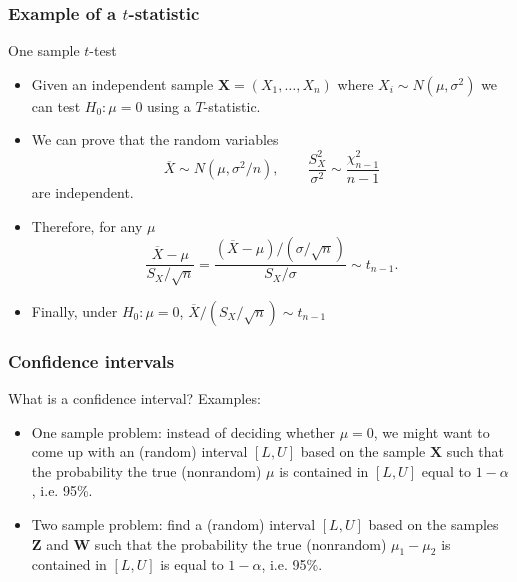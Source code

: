 \documentclass[handout]{beamer}
\begin{document}
   \begin{frame} \frametitle{Example of a $t$-statistic}

   \begin{block}
   {One sample $t$-test}
   \begin{itemize}

   \item Given an independent sample $\pmb{X}=(X_1, \dots, X_n)$ where $X_i\sim N(\mu,\sigma^2)$ we can test $H_0:\mu=0$ using a $T$-statistic.

   \item We can prove that the random variables
   $$\overline{X} \sim N(\mu, \sigma^2/n), \qquad \frac{S^2_X}{\sigma^2} \sim \frac{\chi^2_{n-1}}{n-1}$$
   are independent.

   \item Therefore, for any $\mu$
   $$
   \frac{\overline{X} - \mu}{S_X / \sqrt{n}} = \frac{ (\overline{X}-\mu) / (\sigma/\sqrt{n})}{S_X / \sigma} \sim t_{n-1}.$$
   \item Finally, under $H_0:\mu=0$, $\overline{X}/(S_X/\sqrt{n}) \sim t_{n-1}
   $
   \end{itemize}
   \end{block}
   \end{frame}


   \begin{frame} \frametitle{Confidence intervals}

   \begin{block}
   {What is a confidence interval?}
   Examples:
   \begin{itemize}[<+->]
   \item One sample problem: instead of deciding whether $\mu=0$, we might want to come up with an (random) interval $[L,U]$ based on the sample $\pmb{X}$ such that the probability
   the true (nonrandom) $\mu$ is contained in $[L,U]$ equal to $1-\alpha$, i.e. 95\%.
   \item Two sample problem: find a (random) interval $[L,U]$ based on the samples $\pmb{Z}$ and $\pmb{W}$ such that
   the probability the true (nonrandom) $\mu_1-\mu_2$ is contained in $[L,U]$ is equal to $1-\alpha$, i.e. 95\%.
   \end{itemize}
   \end{block}
   \end{frame}

\end{document}
